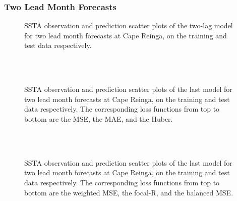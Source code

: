 \documentclass[11pt, a4paper]{article}
\begin{document}
\subsubsection{Two Lead Month Forecasts}

\begin{figure}[H]
\centering
{}
\caption{SSTA observation and prediction scatter plots of the two-lag model for two lead month forecasts at Cape Reinga, on the training and test data respectively.}
\end{figure}

\begin{figure}[H]
\centering
{}
\\
\\
\caption{SSTA observation and prediction scatter plots of the last model for two lead month forecasts at Cape Reinga, on the training and test data respectively. The corresponding loss functions from top to bottom are the MSE, the MAE, and the Huber.}
\end{figure}

\begin{figure}[H]
\centering
{}
\\
\\
\caption{SSTA observation and prediction scatter plots of the last model for two lead month forecasts at Cape Reinga, on the training and test data respectively. The corresponding loss functions from top to bottom are the weighted MSE, the focal-R, and the balanced MSE.}
\end{figure}
\end{document}
